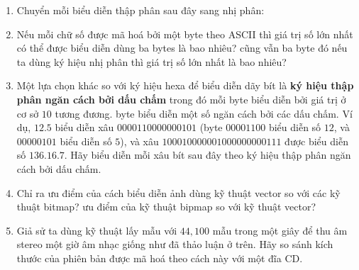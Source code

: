 \begin{enumerate}
\item Chuyển mỗi biểu diễn thập phân sau đây sang nhị phân:


\item Nếu mỗi chữ số được mã hoá bởi một byte theo ASCII thì giá trị số lớn nhất có thể
  được biểu diễn dùng ba bytes là bao nhiêu? cũng vẫn ba byte đó nếu ta dùng ký hiệu nhị
  phân thì giá trị số lớn nhất là bao nhiêu?

\item Một lựa chọn khác so với ký hiệu hexa để biểu diễn dãy bít là \textbf{ký hiệu thập
    phân ngăn cách bởi dấu chấm} trong đó mỗi byte biểu diễn bởi giá trị ở cơ sở $10$
  tương đương. byte biểu diễn một số ngăn cách bởi các dấu chấm. Ví dụ, $12.5$ biểu diễn
  xâu $0000110000000101$ (byte $00001100$ biểu diễn số $12$, và $00000101$ biểu diễn số
  $5$), và xâu $100010000001000000000111$ được biểu diễn số $136.16.7$. Hãy biểu diễn mỗi
  xâu bít sau đây theo ký hiệu thập phân ngăn cách bởi dấu chấm.


\item Chỉ ra ưu điểm của cách biểu diễn ảnh dùng kỹ thuật vector so với các kỹ thuật
  bitmap? ưu điểm của kỹ thuật bipmap so với kỹ thuật vector?

\item Giả sử ta dùng kỹ thuật lấy mẫu với $44,100$ mẫu trong một giây để thu âm stereo một
  giờ âm nhạc giống như đã thảo luận ở trên. Hãy so sánh kích thước của phiên bản được mã
  hoá theo cách này với một đĩa CD.
\end{enumerate}


















